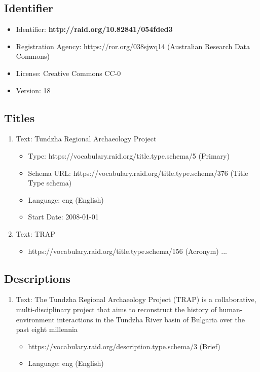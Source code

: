 \begin{framed}

\parbox{0.9\linewidth}{
   
\subsection*{Identifier}
\begin{itemize}
\item Identifier: \textbf{http://raid.org/10.82841/054fded3}
\item Registration Agency: https://ror.org/038sjwq14 (Australian Research Data Commons)
\item License: Creative Commons CC-0
\item Version: 18
\end{itemize}

\subsection*{Titles}
\begin{enumerate}
\item Text: Tundzha Regional Archaeology Project
   \begin{itemize}
   \item Type: https://vocabulary.raid.org/title.type.schema/5 (Primary)
   \item Schema URL: https://vocabulary.raid.org/title.type.schema/376 (Title Type schema)
   \item Language: eng (English)
   \item Start Date: 2008-01-01
   \end{itemize}

\item Text: TRAP
   \begin{itemize}
   \item https://vocabulary.raid.org/title.type.schema/156 (Acronym) ...
   \end{itemize}
\end{enumerate}

\subsection*{Descriptions}
\begin{enumerate}
\item Text: The Tundzha Regional Archaeology Project (TRAP) is a collaborative, multi-disciplinary project that aims to reconstruct the history of human-environment interactions in the Tundzha River basin of Bulgaria over the past eight millennia
   \begin{itemize}
   \item https://vocabulary.raid.org/description.type.schema/3 (Brief)
   \item Language: eng (English)
   \end{itemize}


\end{enumerate}}
\end{framed}
